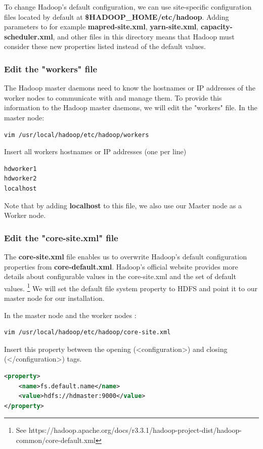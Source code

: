 \documentclass[12pt,english]{book}
\begin{document}
To change Hadoop's default configuration, we can use site-specific configuration files located by default at \textbf{\$HADOOP\_HOME/etc/hadoop}.
Adding parameters to for example \textbf{mapred-site.xml}, \textbf{yarn-site.xml}, \textbf{capacity-scheduler.xml}, and other files in this directory means that Hadoop must consider these new properties listed instead of the default values.

\subsubsection{Edit the "workers" file}


The Hadoop master daemons need to know the hostnames or IP addresses of the worker nodes to communicate with and manage them. To provide this information to the Hadoop master daemons, we will edit the "workers" file.
In the master node:
\begin{lstlisting}[language=bash, frame=single]
vim /usr/local/hadoop/etc/hadoop/workers
\end{lstlisting}
Insert all workers hostnames or IP addresses (one per line)
\begin{lstlisting}[language=bash, frame=single]
hdworker1
hdworker2
localhost
\end{lstlisting}
Note that by adding \textbf{localhost} to this file, we also use our Master node as a Worker node. 


\subsubsection{Edit the "core-site.xml" file}


The \textbf{core-site.xml} file enables us to overwrite Hadoop's default configuration properties from \textbf{core-default.xml}.
Hadoop's official website provides more details about configurable values in the core-site.xml and the set of default values.
\footnote{See https://hadoop.apache.org/docs/r3.3.1/hadoop-project-dist/hadoop-common/core-default.xml}
We will set the default file system property to HDFS and point it to our master node for our installation.

In the master node and the worker nodes :
\begin{lstlisting}[language=bash, frame=single]
vim /usr/local/hadoop/etc/hadoop/core-site.xml
\end{lstlisting}
Insert this property between the opening (<configuration>) and closing (</configuration>) tags. 
\begin{lstlisting}[language=xml, frame=single]
<property>
	<name>fs.default.name</name>
	<value>hdfs://hdmaster:9000</value>
</property>
\end{lstlisting}
\end{document}
